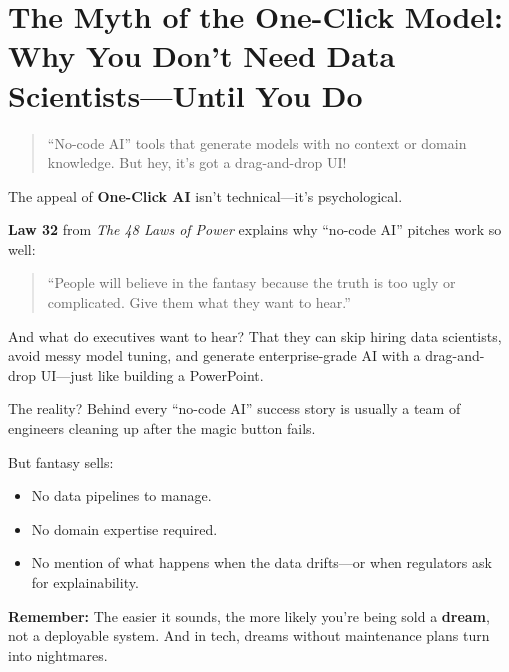 \section{The Myth of the One-Click Model: Why You Don’t Need Data Scientists—Until You Do}

\begin{quote}
“No-code AI” tools that generate models with no context or domain knowledge. But hey, it’s got a drag-and-drop UI!
\end{quote}

  The appeal of \textbf{One-Click AI} isn’t technical—it’s psychological.
  
  \medskip
  
  \textbf{Law 32} from \textit{The 48 Laws of Power} explains why ``no-code AI'' pitches work so well:
  \begin{quote}
  ``People will believe in the fantasy because the truth is too ugly or complicated. Give them what they want to hear.''
  \end{quote}
  
  \medskip
  
  And what do executives want to hear? That they can skip hiring data scientists, avoid messy model tuning, and generate enterprise-grade AI with a drag-and-drop UI—just like building a PowerPoint.
  
  \medskip
  
  The reality? Behind every ``no-code AI'' success story is usually a team of engineers cleaning up after the magic button fails.
  
  \medskip
  
  But fantasy sells:
  \begin{itemize}
    \item No data pipelines to manage.
    \item No domain expertise required.
    \item No mention of what happens when the data drifts—or when regulators ask for explainability.
  \end{itemize}
  
  \medskip
  
  \textbf{Remember:} The easier it sounds, the more likely you’re being sold a \textbf{dream}, not a deployable system.  And in tech, dreams without maintenance plans turn into nightmares.
  
  





